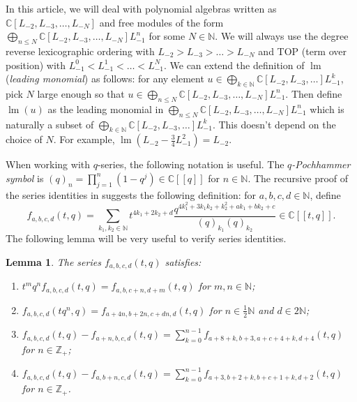 \documentclass[a4paper, 12pt, reqno]{amsart}
\newtheorem{lemma}[theorem]{Lemma}
\theoremstyle{remark}
\DeclareMathOperator{\lm}{lm}
\begin{document}
In this article, we will deal with polynomial algebras written as $\mathbb{C}[L_{-2}, L_{-3}, \dots, L_{-N}]$ and free modules of the form $\bigoplus_{n \le N}\mathbb{C}[L_{-2}, L_{-3}, \dots, L_{-N}]L_{-1}^n$ for some $N \in \mathbb{N}$.
We will always use the degree reverse lexicographic ordering with $L_{-2} > L_{-3} > \dots > L_{-N}$ and TOP (term over position) with $L_{-1}^0 < L_{-1}^1 < \dots < L_{-1}^N$.
We can extend the definition of $\lm$ (\emph{leading monomial}) as follows: for any element $u \in \bigoplus_{k \in \mathbb{N}}\mathbb{C}[L_{-2}, L_{-3}, \dots]L_{-1}^k$, pick $N$ large enough so that $u \in \bigoplus_{n \le N}\mathbb{C}[L_{-2}, L_{-3}, \dots, L_{-N}]L_{-1}^n$.
Then define $\lm(u)$ as the leading monomial in $\bigoplus_{n \le N}\mathbb{C}[L_{-2}, L_{-3}, \dots, L_{-N}]L_{-1}^n$ which is naturally a subset of $\bigoplus_{k \in \mathbb{N}}\mathbb{C}[L_{-2}, L_{-3}, \dots]L_{-1}^k$.
This doesn't depend on the choice of $N$.
For example, $\lm(L_{-2} - \frac{3}{4}L_{-1}^2) = L_{-2}$.

When working with $q$-series, the following notation is useful.
The \emph{$q$-Pochhammer symbol} is $(q)_n = \prod_{j = 1}^n(1 - q^j) \in \mathbb{C}[[q]]$ for $n \in \mathbb{N}$.
The recursive proof of the series identities in \cite{andrews_singular_2022} suggests the following definition: for $a, b, c, d \in \mathbb{N}$, define
\begin{equation*}
  f_{a, b, c, d}(t, q) = \sum_{k_1, k_2 \in \mathbb{N}}t^{4k_1 + 2k_2 + d}\frac{q^{4k_1^2 + 3k_1k_2 + k_2^2 + ak_1 + bk_2 + c}}{(q)_{k_1}(q)_{k_2}} \in \mathbb{C}[[t, q]].
\end{equation*}
The following lemma will be very useful to verify series identities.

\begin{lemma}
  \label{lmm:1}
  The series $f_{a, b, c, d}(t, q)$ satisfies:
  \begin{enumerate}
  \item $t^mq^nf_{a, b, c, d}(t, q) = f_{a, b, c + n, d + m}(t, q)$ for $m, n \in \mathbb{N}$;
  \item $f_{a, b, c, d}(tq^n, q) = f_{a + 4n, b + 2n, c + dn, d}(t, q)$ for $n \in \frac{1}{2}\mathbb{N}$ and $ d \in 2\mathbb{N}$;
  \item $f_{a, b, c, d}(t, q) - f_{a + n, b, c, d}(t, q) = \sum_{k = 0}^{n - 1}f_{a + 8 + k, b + 3, a + c + 4 + k, d + 4}(t, q)$ for $n \in \mathbb{Z}_+$;
  \item $f_{a, b, c, d}(t, q) - f_{a, b + n, c, d}(t, q) = \sum_{k = 0}^{n - 1}f_{a + 3, b + 2 + k, b + c + 1 + k, d + 2}(t, q)$ for $n \in \mathbb{Z}_+$.
  \end{enumerate}
\end{lemma}
\end{document}
